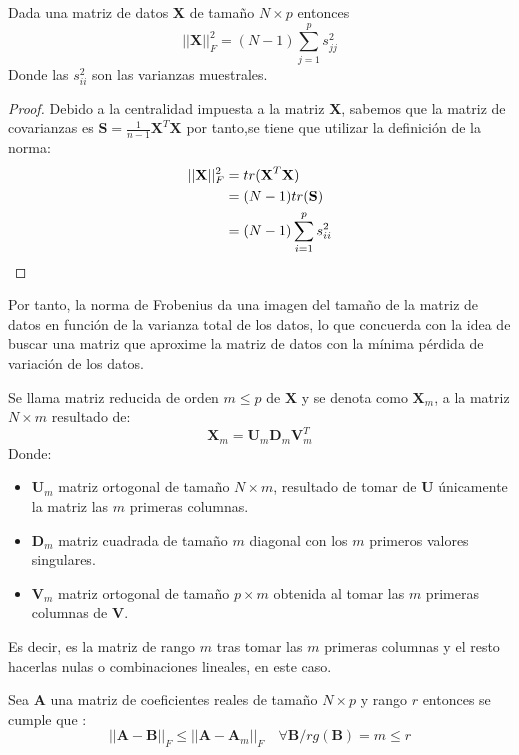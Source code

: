 \begin{propo}
Dada una matriz de datos \textbf{X} de tamaño $N\times p$ entonces
\begin{equation}
||\textbf{X}||_F^2=(N-1)\sum_{j=1}^p s_{jj}^2
\end{equation}
Donde las $s_{ii}^2$ son las varianzas muestrales.
\begin{proof}
Debido a la centralidad impuesta a la matriz \textbf{X}, sabemos que la matriz de covarianzas es $\textbf{S}=\frac{1}{n-1}\textbf{X}^T \textbf{X}$ por tanto,se tiene que utilizar la definición de la norma:
\begin{align*}
||\textbf{X}||_F^2 &= tr(\textbf{X}^T\textbf{X})\\
&= (N-1) tr(\textbf{S})\\
&= (N-1) \sum_{i=1}^p s_{ii}^2 \qedhere
\end{align*}
\end{proof}
\end{propo}
\noindent Por tanto, la norma de Frobenius da una imagen del tamaño de la matriz de datos en función de la varianza total de los datos, lo que concuerda con la idea de buscar una matriz que aproxime la matriz de datos con la mínima pérdida de variación de los datos.  

\begin{defi}
Se llama matriz reducida de orden $m\leq p$ de $\textbf{X}$ y se denota como $\textbf{X}_m$, a la matriz $N\times m $ resultado de:
\begin{equation}
\textbf{X}_m=\textbf{U}_m\mathbf{D}_m\textbf{V}^T_m
\end{equation}
Donde:
\begin{itemize}
\item $\textbf{U}_m$ matriz ortogonal de tamaño $N \times m$, resultado de tomar de \textbf{U} únicamente la matriz las $m$ primeras columnas. 
\item $\mathbf{D}_m$  matriz cuadrada de tamaño $m$ diagonal con los $m$ primeros valores singulares. 
\item $\textbf{V}_m$ matriz ortogonal de tamaño $p \times m$ obtenida al tomar las $m$ primeras columnas de \textbf{V}.
\end{itemize}
Es decir, es la matriz de rango $m$ tras tomar las  $m$ primeras columnas y el resto hacerlas nulas o combinaciones lineales, en este caso.
\end{defi}
\begin{teorema}
Sea \textbf{A} una matriz de coeficientes reales de tamaño $N\times p$ y rango $r$  entonces se cumple que \cite{Eckart 1936, Golub 1987}:
\begin{equation}
||\textbf{A}-\textbf{B}||_F\leq ||\textbf{A}-\textbf{A}_m||_F \quad \forall \textbf{B}/ rg(\textbf{B})=m \leq r
\end{equation} 
\end{teorema}

